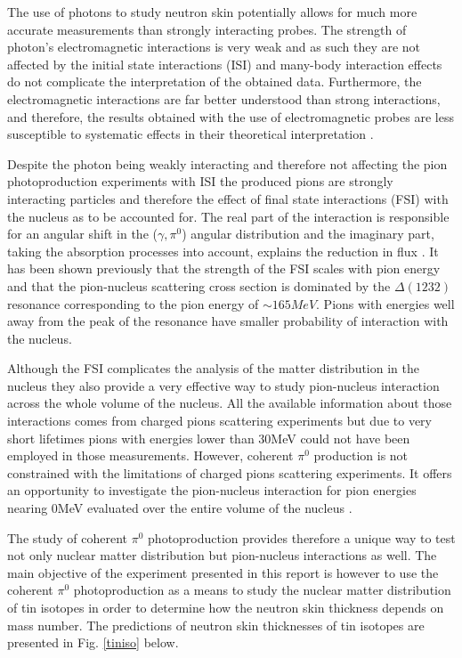 \indent The use of photons  to study neutron skin potentially allows for much more accurate measurements than strongly interacting probes. The strength of photon's electromagnetic interactions is very weak and as such they are not affected by the initial state interactions (ISI) and many-body interaction effects do not complicate the interpretation of the obtained data. Furthermore, the electromagnetic interactions are far better understood than strong interactions, and therefore, the results obtained with the use of electromagnetic probes are less susceptible to systematic effects in their theoretical interpretation \cite{claire}.

\indent Despite the photon being weakly interacting and therefore not affecting the pion photoproduction experiments with ISI the produced pions are strongly interacting particles and therefore the effect of final state interactions (FSI) with the nucleus as to be accounted for. The real part of the interaction is responsible for an angular shift in the ($\gamma,\pi^{0}$) angular distribution and the imaginary part, taking the absorption processes into account, explains the reduction in flux \cite{Proposal}. It has been shown previously that the strength of the FSI scales with pion energy and that the pion-nucleus scattering cross section is dominated by the $\Delta(1232)$ resonance corresponding to the pion energy of $\sim165MeV$. Pions with energies well away from the peak of the resonance have smaller probability of interaction with the nucleus.

\indent Although the FSI complicates the analysis of the matter distribution in the nucleus they also provide a very effective way to study pion-nucleus interaction across the whole volume of the nucleus. All the available information about those interactions comes from charged pions scattering experiments but due to very short lifetimes pions with energies lower than 30MeV could not have been employed in those measurements. However, coherent $\pi^{0}$ production is not constrained with the limitations of charged pions scattering experiments. It offers an opportunity to investigate the pion-nucleus interaction for pion energies nearing 0MeV evaluated over the entire volume of the nucleus \cite{claire}.

\indent The study of coherent $\pi^{0}$ photoproduction provides therefore a unique way to test not only nuclear matter distribution but pion-nucleus interactions as well. The main objective of the experiment presented in this report is however to use the coherent $\pi^{0}$ photoproduction as a means to study the nuclear matter distribution of tin isotopes in order to determine how the neutron skin thickness depends on mass number. The predictions of neutron skin thicknesses of tin isotopes are presented in Fig. \ref{tiniso} below.

